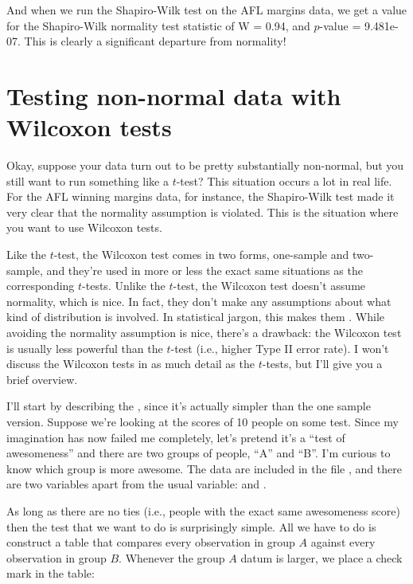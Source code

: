 \begin{center}
\end{center}

And when we run the Shapiro-Wilk test on the AFL margins data, we get a value for the Shapiro-Wilk normality test statistic of W = 0.94, and $p$-value = 9.481e-07. This is clearly a significant departure from normality!


\section{Testing non-normal data with Wilcoxon tests\label{sec:wilcox}}

Okay, suppose your data turn out to be pretty substantially non-normal, but you still want to run something like a $t$-test? This situation occurs a lot in real life. For the AFL winning margins data, for instance, the Shapiro-Wilk test made it very clear that the normality assumption is violated. This is the situation where you want to use Wilcoxon tests. 

Like the $t$-test, the Wilcoxon test comes in two forms, one-sample and two-sample, and they're used in more or less the exact same situations as the corresponding $t$-tests. Unlike the $t$-test, the Wilcoxon test doesn't assume normality, which is nice. In fact, they don't make any assumptions about what kind of distribution is involved. In statistical jargon, this makes them . While avoiding the normality assumption is nice, there's a drawback: the Wilcoxon test is usually less powerful than the $t$-test (i.e., higher Type II error rate). I won't discuss the Wilcoxon tests in as much detail as the $t$-tests, but I'll give you a brief overview.


I'll start by describing the , since it's actually simpler than the one sample version. Suppose we're looking at the scores of 10 people on some test. Since my imagination has now failed me completely, let's pretend it's a ``test of awesomeness'' and there are two groups of people, ``A'' and ``B''. I'm curious to know which group is more awesome. The data are included in the file , and there are two variables apart from the usual  variable:  and .

As long as there are no ties (i.e., people with the exact same awesomeness score) then the test that we want to do is surprisingly simple. All we have to do is construct a table that compares every observation in group $A$ against every observation in group $B$. Whenever the group $A$ datum is larger, we place a check mark in the table:


